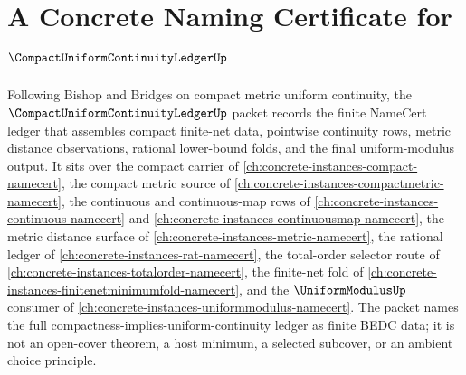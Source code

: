 \chapter{A Concrete Naming Certificate for $\CompactUniformContinuityLedgerUp$}
\label{ch:concrete-instances-compact-uniform-continuity-ledger-namecert}

Following Bishop and Bridges on compact metric uniform continuity, the $\CompactUniformContinuityLedgerUp$ packet records the finite NameCert ledger that assembles compact finite-net data, pointwise continuity rows, metric distance observations, rational lower-bound folds, and the final uniform-modulus output. It sits over the compact carrier of \autoref{ch:concrete-instances-compact-namecert}, the compact metric source of \autoref{ch:concrete-instances-compactmetric-namecert}, the continuous and continuous-map rows of \autoref{ch:concrete-instances-continuous-namecert} and \autoref{ch:concrete-instances-continuousmap-namecert}, the metric distance surface of \autoref{ch:concrete-instances-metric-namecert}, the rational ledger of \autoref{ch:concrete-instances-rat-namecert}, the total-order selector route of \autoref{ch:concrete-instances-totalorder-namecert}, the finite-net fold of \autoref{ch:concrete-instances-finitenetminimumfold-namecert}, and the $\UniformModulusUp$ consumer of \autoref{ch:concrete-instances-uniformmodulus-namecert}. The packet names the full compactness-implies-uniform-continuity ledger as finite BEDC data; it is not an open-cover theorem, a host minimum, a selected subcover, or an ambient choice principle.

